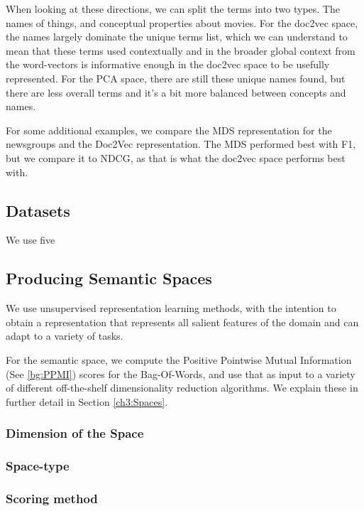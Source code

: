 When looking at these directions, we can split the terms into two types. The names of things, and conceptual properties about movies. For the doc2vec space, the names largely dominate the unique terms list, which we can understand to mean that these terms used contextually and in the broader global context from the word-vectors is informative enough in the doc2vec space to be usefully represented. For the PCA space, there are still these unique names found, but there are less overall terms and it's a bit more balanced between concepts and names. 

For some additional examples, we compare the MDS representation for the newsgroups and the Doc2Vec representation. The MDS performed best with F1, but we compare it to NDCG, as that is what the doc2vec space performs best with.



\subsection{Datasets}

We use five 

\subsection{Producing Semantic Spaces}

We use unsupervised representation learning methods, with the intention to obtain a representation that represents all salient features of the domain and can adapt to a variety of tasks. 

For the semantic space, we compute the Positive Pointwise Mutual Information (See \ref{bg:PPMI}) scores for the Bag-Of-Words, and use that as input to a variety of different off-the-shelf dimensionality reduction algorithms. We explain these in further detail in Section \ref{ch3:Spaces}. 

\subsubsection{Dimension of the Space}

\subsubsection{Space-type}

\subsubsection{Scoring method}

